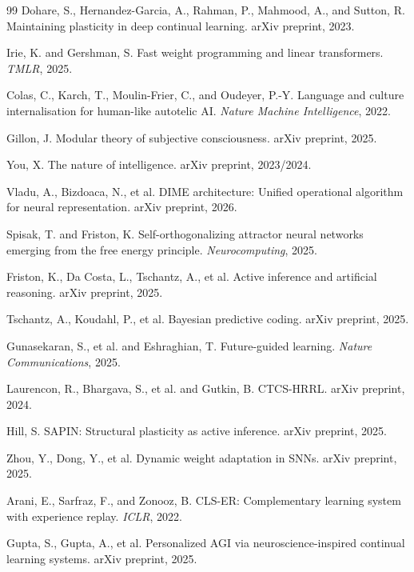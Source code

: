 \documentclass[11pt,a4paper]{article}
\begin{document}
\begin{thebibliography}{99}
Dohare, S., Hernandez-Garcia, A., Rahman, P., Mahmood, A., and Sutton, R.
Maintaining plasticity in deep continual learning.
arXiv preprint, 2023.

Irie, K. and Gershman, S.
Fast weight programming and linear transformers.
\textit{TMLR}, 2025.

Colas, C., Karch, T., Moulin-Frier, C., and Oudeyer, P.-Y.
Language and culture internalisation for human-like autotelic AI.
\textit{Nature Machine Intelligence}, 2022.

Gillon, J.
Modular theory of subjective consciousness.
arXiv preprint, 2025.

You, X.
The nature of intelligence.
arXiv preprint, 2023/2024.

Vladu, A., Bizdoaca, N., et al.
DIME architecture: Unified operational algorithm for neural representation.
arXiv preprint, 2026.

Spisak, T. and Friston, K.
Self-orthogonalizing attractor neural networks emerging from the free energy principle.
\textit{Neurocomputing}, 2025.

Friston, K., Da Costa, L., Tschantz, A., et al.
Active inference and artificial reasoning.
arXiv preprint, 2025.

Tschantz, A., Koudahl, P., et al.
Bayesian predictive coding.
arXiv preprint, 2025.

Gunasekaran, S., et al. and Eshraghian, T.
Future-guided learning.
\textit{Nature Communications}, 2025.

Laurencon, R., Bhargava, S., et al. and Gutkin, B.
CTCS-HRRL.
arXiv preprint, 2024.

Hill, S.
SAPIN: Structural plasticity as active inference.
arXiv preprint, 2025.

Zhou, Y., Dong, Y., et al.
Dynamic weight adaptation in SNNs.
arXiv preprint, 2025.

Arani, E., Sarfraz, F., and Zonooz, B.
CLS-ER: Complementary learning system with experience replay.
\textit{ICLR}, 2022.

Gupta, S., Gupta, A., et al.
Personalized AGI via neuroscience-inspired continual learning systems.
arXiv preprint, 2025.


\end{thebibliography}
\end{document}
